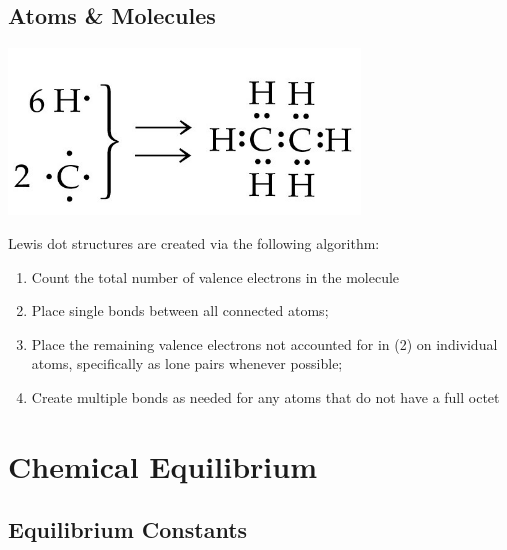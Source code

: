 \documentclass{tufte-book}
\begin{document}
\section{Atoms \& Molecules}
\begin{marginfigure}[3cm]
\begin{center}
  \includegraphics[width=0.7\textwidth]{lewis} \phantom{mmmm}
\end{center}
\end{marginfigure}
Lewis dot structures are created via the following algorithm: \begin{enumerate}
  \item Count the total number of valence electrons in the molecule
  \item Place single bonds between all connected atoms;
  \item Place the remaining valence electrons not accounted for in (2) on individual atoms, specifically as lone pairs whenever possible;
  \item Create multiple bonds as needed for any atoms that do not have a full octet
\end{enumerate}

\chapter{Chemical Equilibrium}

\section{Equilibrium Constants}
\end{document}
